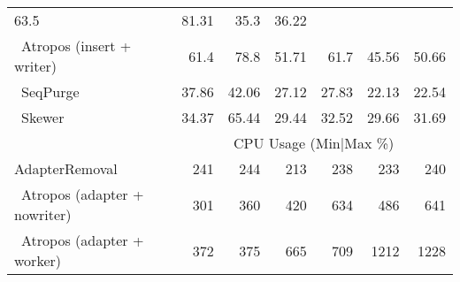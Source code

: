 \begin{table}[ht]
\begin{tabular}{lr|rr|rr|r}
        
        63.5
        & 81.31 &
        
        
        35.3
        & 36.22
        
        \\\        Atropos (insert + writer) &
        
        61.4
        & 78.8 &
        
        
        51.71
        & 61.7 &
        
        
        45.56
        & 50.66
        
        \\\        SeqPurge &
        
        37.86
        & 42.06 &
        
        
        27.12
        & 27.83 &
        
        
        22.13
        & 22.54
        
        \\\        Skewer &
        
        34.37
        & 65.44 &
        
        
        29.44
        & 32.52 &
        
        
        29.66
        & 31.69
        
        \\\hline
    
    \hfill{} & \multicolumn{6}{c}{CPU Usage (Min$|$Max \%)} \\\hline
    
        AdapterRemoval &
        
        241
        & 244 &
        
        
        213
        & 238 &
        
        
        233
        & 240
        
        \\\    
        Atropos (adapter + nowriter) &
        
        301
        & 360 &
        
        
        420
        & 634 &
        
        
        486
        & 641
        
        \\\    
        Atropos (adapter + worker) &
        
        372
        & 375 &
        
        
        665
        & 709 &
        
        
        1212
        & 1228
        

\end{tabular}
\end{table}
